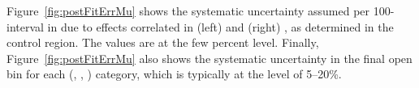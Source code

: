 Figure~\ref{fig:postFitErrMu} shows the systematic uncertainty assumed
per 100\GeV-interval in \mht due to effects correlated in (left)
\njet and (right) \scalht, as determined in the \mj control
region. The values are at the few percent level. Finally,
Figure~\ref{fig:postFitErrMu} also shows the systematic uncertainty in
the final open \mht bin for each (\njet, \scalht, \nb) category, which
is typically at the level of 5--20\%.



